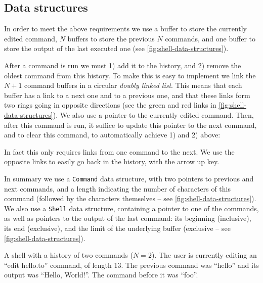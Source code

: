 \subsection{Data structures}

In order to meet the above requirements we use a buffer to store the currently
edited command, $N$ buffers to store the previous $N$ commands, and one buffer
to store the output of the last executed one (see
\cref{fig:shell-data-structures}).

After a command is run we must 1) add it to the history, and 2) remove the
oldest command from this history. To make this is easy to implement we link the
$N+1$ command buffers in a circular {\em doubly linked list}. This means that
each buffer has a link to a next one and to a previous one, and that these
links form two rings going in opposite directions (see the green and red links
in \cref{fig:shell-data-structures}). We also use a pointer to the currently
edited command. Then, after this command is run, it suffice to update this
pointer to the next command, and to clear this command, to automatically
achieve 1) and 2) above:

\begin{center}

\end{center}

\noindent In fact this only requires links from one command to the next. We use
the opposite links to easily go back in the history, with the arrow up key.

In summary we use a {\tt Command} data structure, with two pointers to previous
and next commands, and a length indicating the number of characters of this
command (followed by the characters themselves -- see
\cref{fig:shell-data-structures}). We also use a {\tt Shell} data structure,
containing a pointer to one of the commands, as well as pointers to the output
of the last command: its beginning (inclusive), its end (exclusive), and the
limit of the underlying buffer (exclusive -- see
\cref{fig:shell-data-structures}).

\begin{Figure}
  

  \caption{A shell with a history of two commands ($N=2$). The user is
  currently editing an ``edit hello.to'' command, of length 13. The previous
  command was ``hello'' and its output was ``Hello, World!''. The command
  before it was ``foo''.}\label{fig:shell-data-structures}
\end{Figure}

